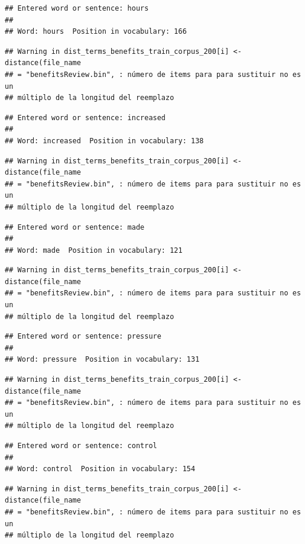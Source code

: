\documentclass[spanish,]{article}
\begin{document}
\begin{verbatim}
## Entered word or sentence: hours
## 
## Word: hours  Position in vocabulary: 166
\end{verbatim}

\begin{verbatim}
## Warning in dist_terms_benefits_train_corpus_200[i] <- distance(file_name
## = "benefitsReview.bin", : número de items para para sustituir no es un
## múltiplo de la longitud del reemplazo
\end{verbatim}

\begin{verbatim}
## Entered word or sentence: increased
## 
## Word: increased  Position in vocabulary: 138
\end{verbatim}

\begin{verbatim}
## Warning in dist_terms_benefits_train_corpus_200[i] <- distance(file_name
## = "benefitsReview.bin", : número de items para para sustituir no es un
## múltiplo de la longitud del reemplazo
\end{verbatim}

\begin{verbatim}
## Entered word or sentence: made
## 
## Word: made  Position in vocabulary: 121
\end{verbatim}

\begin{verbatim}
## Warning in dist_terms_benefits_train_corpus_200[i] <- distance(file_name
## = "benefitsReview.bin", : número de items para para sustituir no es un
## múltiplo de la longitud del reemplazo
\end{verbatim}

\begin{verbatim}
## Entered word or sentence: pressure
## 
## Word: pressure  Position in vocabulary: 131
\end{verbatim}

\begin{verbatim}
## Warning in dist_terms_benefits_train_corpus_200[i] <- distance(file_name
## = "benefitsReview.bin", : número de items para para sustituir no es un
## múltiplo de la longitud del reemplazo
\end{verbatim}

\begin{verbatim}
## Entered word or sentence: control
## 
## Word: control  Position in vocabulary: 154
\end{verbatim}

\begin{verbatim}
## Warning in dist_terms_benefits_train_corpus_200[i] <- distance(file_name
## = "benefitsReview.bin", : número de items para para sustituir no es un
## múltiplo de la longitud del reemplazo
\end{verbatim}
\end{document}
